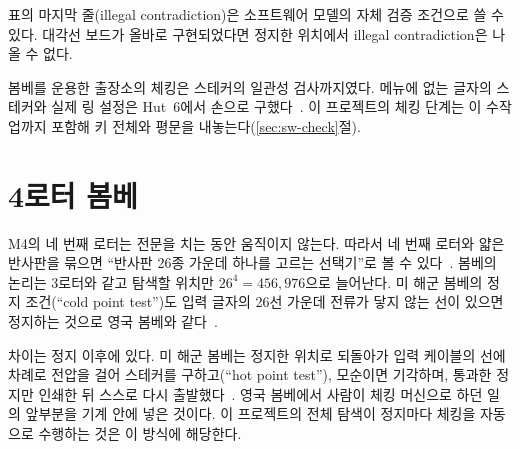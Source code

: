 표의 마지막 줄(illegal contradiction)은 소프트웨어 모델의 자체 검증 조건으로 쓸 수 있다. 대각선 보드가 올바로 구현되었다면
정지한 위치에서 illegal contradiction은 나올 수 없다.

봄베를 운용한 출장소의 체킹은 스테커의 일관성 검사까지였다. 메뉴에 없는 글자의 스테커와 실제 링 설정은
Hut~6에서 손으로 구했다~\cite{ellsbury1998bombe,carter2010bombe}. 이 프로젝트의 체킹 단계는 이 수작업까지
포함해 키 전체와 평문을 내놓는다(\ref{sec:sw-check}절).

\section{4로터 봄베}\label{sec:fourrotor}

M4의 네 번째 로터는 전문을 치는 동안 움직이지 않는다. 따라서 네 번째 로터와 얇은 반사판을 묶으면
``반사판 26종 가운데 하나를 고르는 선택기''로 볼 수 있다~\cite{cryptomuseum-bombe}. 봄베의 논리는
3로터와 같고 탐색할 위치만 $26^4 = 456{,}976$으로 늘어난다. 미 해군 봄베의 정지 조건(``cold point test'')도
입력 글자의 26선 가운데 전류가 닿지 않는 선이 있으면 정지하는 것으로 영국 봄베와
같다~\cite{ekhall-hallenberg2018}.

차이는 정지 이후에 있다. 미 해군 봄베는 정지한 위치로 되돌아가 입력 케이블의 선에 차례로 전압을 걸어
스테커를 구하고(``hot point test''), 모순이면 기각하며, 통과한 정지만 인쇄한 뒤 스스로 다시
출발했다~\cite{ekhall-hallenberg2018,desch1942memo}. 영국 봄베에서 사람이 체킹 머신으로 하던 일의 앞부분을
기계 안에 넣은 것이다. 이 프로젝트의 전체 탐색이 정지마다 체킹을 자동으로 수행하는 것은 이 방식에 해당한다.
